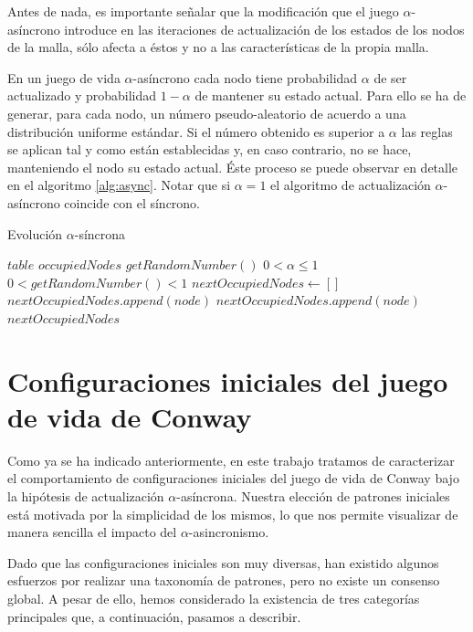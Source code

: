 \documentclass[../proyecto.tex]{memoir}
\begin{document}
Antes de nada, es importante señalar que la modificación que el juego $\alpha$-asíncrono introduce en las iteraciones de actualización de los estados de los nodos de la malla, sólo afecta a éstos y no a las características de la propia malla.

En un juego de vida $\alpha$-asíncrono cada nodo tiene probabilidad $\alpha$ de ser actualizado y probabilidad $1-\alpha$ de mantener su estado actual. Para ello se ha de generar, para cada nodo, un número pseudo-aleatorio de acuerdo a una distribución uniforme estándar. Si el número obtenido es superior a $\alpha$ las reglas se aplican tal y como están establecidas y, en caso contrario, no se hace, manteniendo el nodo su estado actual. Éste proceso se puede observar en detalle en el algoritmo \ref{alg:async}. Notar que si $\alpha=1$ el algoritmo de actualización $\alpha$-asíncrono coincide con el síncrono.

\begin{algorithm}[H]
\caption{Evolución $\alpha$-síncrona}
\label{alg:async}
\begin{algorithmic}
\REQUIRE $table$
\REQUIRE $occupiedNodes$
\REQUIRE $getRandomNumber()$
\ENSURE  $0 < \alpha \leq 1$
\ENSURE $0< getRandomNumber() < 1$
\STATE $nextOccupiedNodes \leftarrow []$
\STATE $nextOccupiedNodes.append(node)$
\STATE $nextOccupiedNodes.append(node)$
\ENDIF
\ENDIF
\ENDFOR
\RETURN $nextOccupiedNodes$
\end{algorithmic}
\end{algorithm}

\section{Configuraciones iniciales del juego de vida de Conway} \label{zoo}

Como ya se ha indicado anteriormente, en este trabajo tratamos de caracterizar el comportamiento de configuraciones iniciales del juego de vida de Conway bajo la hipótesis de actualización $\alpha$-asíncrona. Nuestra elección de patrones iniciales está motivada por la simplicidad de los mismos, lo que nos permite visualizar de manera sencilla el impacto del $\alpha$-asincronismo.

Dado que las configuraciones iniciales son muy diversas, han existido algunos esfuerzos por realizar una taxonomía de patrones, pero no existe un consenso global. A pesar de ello, hemos considerado la existencia de tres categorías principales que, a continuación, pasamos a describir.
\end{document}
